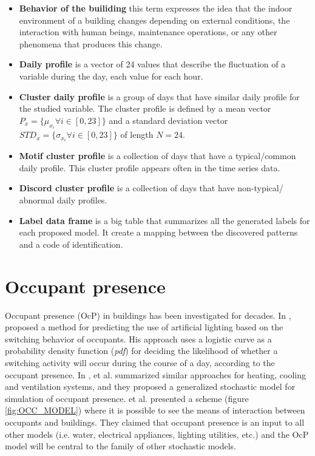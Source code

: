 \begin{itemize}
\item \textbf{Behavior of the builiding} this term expresses the idea that the indoor environment of a building changes depending on external conditions, the interaction with human beings, maintenance operations, or any other phenomena that produces this change.

\item \textbf{Daily profile} is a vector of 24 values that describe the fluctuation of a variable during the day, each value for each hour.

\item \textbf{Cluster daily profile} is a group of days that have similar daily profile for the studied variable. The cluster profile is defined by a mean vector $P_x = \{ \mu_{x_i} \forall i \in [0,23] \}$ and a standard deviation vector $STD_x = \{ \sigma_{x_i} \forall i \in [0,23] \}$ of length $N=24$.
\item  \textbf{Motif cluster profile} is a collection of days that have a typical/common daily profile. This cluster profile appears often in the time series data.
\item  \textbf{Discord cluster profile} is a collection of days that have non-typical/ abnormal daily profiles.

\item \textbf{Label data frame} is a big table that summarizes all the generated labels for each proposed model. It create a mapping between the discovered patterns and a code of identification. 
 
\end{itemize}
 

\section{Occupant presence}

Occupant presence (OcP) in buildings has been investigated for decades. In \citeyear{artf_light_1980}, \citet{artf_light_1980} proposed a method for predicting the use of artificial lighting based on the switching behavior of occupants. His approach uses a logistic curve as a probability density function (\textit{pdf}) for deciding the likelihood of whether a switching activity will occur during the course of a day, according to the occupant presence.
In \citeyear{page_2008}, \citeauthor{page_2008} et al. \citep{page_2008} summarized similar approaches for heating, cooling and ventilation systems, and they proposed a generalized stochastic model for simulation of occupant presence. \citeauthor{page_2008} et al. \citep{page_2008} presented a scheme (figure \ref{fig:OCC_MODEL}) where it is possible to see the means of interaction between occupants and buildings. They claimed that occupant presence is an input to all other models (i.e. water, electrical appliances, lighting utilities, etc.) and the OcP model will be central to the family of other stochastic models.

